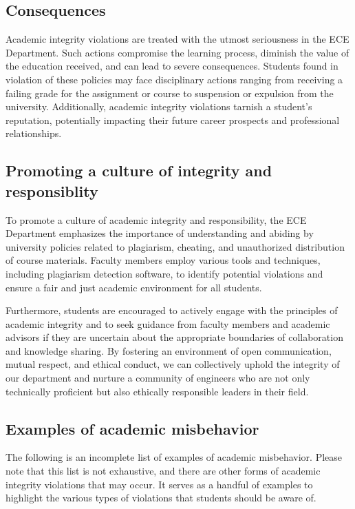 \subsection{Consequences}
\label{sec:consequences}

Academic integrity violations are treated with the utmost seriousness in the ECE Department. Such actions compromise the learning process, diminish the value of the education received, and can lead to severe consequences. Students found in violation of these policies may face disciplinary actions ranging from receiving a failing grade for the assignment or course to suspension or expulsion from the university. Additionally, academic integrity violations tarnish a student's reputation, potentially impacting their future career prospects and professional relationships.

\subsection{Promoting a culture of integrity and responsiblity}
\label{sec:prom-cult-integr}

To promote a culture of academic integrity and responsibility, the ECE Department emphasizes the importance of understanding and abiding by university policies related to plagiarism, cheating, and unauthorized distribution of course materials. Faculty members employ various tools and techniques, including plagiarism detection software, to identify potential violations and ensure a fair and just academic environment for all students.

Furthermore, students are encouraged to actively engage with the principles of academic integrity and to seek guidance from faculty members and academic advisors if they are uncertain about the appropriate boundaries of collaboration and knowledge sharing. By fostering an environment of open communication, mutual respect, and ethical conduct, we can collectively uphold the integrity of our department and nurture a community of engineers who are not only technically proficient but also ethically responsible leaders in their field.


\subsection{Examples of academic misbehavior}
\label{sec:exampl-acad-misb}

The following is an incomplete list of examples of academic misbehavior.  Please note that this list is not exhaustive, and there are other forms of academic integrity violations that may occur. It serves as a handful of examples to highlight the various types of violations that students should be aware of.

